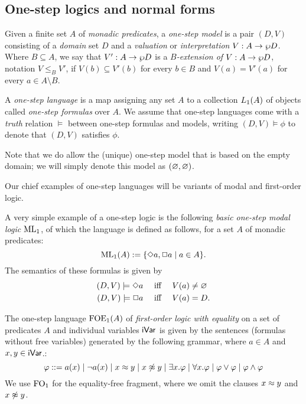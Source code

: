\subsection{One-step logics and normal forms}
\label{sec:onestep-short}
\label{ssec:onestep}

\begin{definition}\label{def:one-step}
Given a finite set $A$ of \emph{monadic predicates}, a \emph{one-step model} is
a pair $(D, V)$ consisting of a \emph{domain} set $D$ and a \emph{valuation}
or \emph{interpretation} $V : A \to \wp D$. 
Where $B \subseteq A$, we say that $V' : A \to \wp D$ is a 
\emph{$B$-extension of} $V : A \to \wp D$, notation $V \leq_{B} V'$,
if $V(b) \subseteq V'(b)$ for every $b \in B$ and $V(a) = V'(a)$ 
for every $a \in A \setminus B$. 

A \emph{one-step language} is a map assigning any set $A$ to a collection
$L_{1}(A)$ of objects called \emph{one-step formulas} over $A$. 
We assume that one-step languages come with a \emph{truth} relation $\models$
between one-step formulas and models, writing $(D, V) \models \phi$ to
denote that $(D,V)$ satisfies $\phi$.
\end{definition}

Note that we do allow the (unique) one-step model that is based on the empty
domain; we will simply denote this model as $(\varnothing,\varnothing)$.

Our chief examples of one-step languages will be variants of modal and 
first-order logic.

\begin{definition}
\label{d:oml}
A very simple example of a one-step logic is the following \emph{basic one-step
modal logic} $\mathrm{ML}_1$, of which the language is defined as follows, for a set 
$A$ of monadic predicates:
\[
\mathrm{ML}_1(A) \mathrel{:=} \{ \Diamond a, \Box a \mid a \in A \}.
\]
The semantics of these formulas is given by
\begin{align*}
   (D, V) \models \Diamond a & \quad\text{ iff }\quad  V(a) \neq \nada
\\ (D, V) \models \Box a     & \quad\text{ iff }\quad  V(a) = D.
\end{align*}
\end{definition}

\begin{definition}
The one-step language $\mathrm{FOE}_1(A)$ of \emph{first-order logic with equality} on 
a set of predicates $A$ and individual variables $\mathsf{iVar}$ is given by the 
sentences (formulas without free variables) generated by the following grammar,
where $a \in A$ and $x,y\in\mathsf{iVar}$.:
\begin{equation}\label{eq:grammarofoe}
\phi \isbnf  a(x) \mid \lnot a(x) \mid x \foeq y \mid x \not\foeq y \mid \exists x.\phi \mid \forall x.\phi \mid \phi \lor \phi \mid \phi \land \phi
\end{equation}
We use $\mathrm{FO}_1$ for the equality-free fragment, where we omit the clauses 
$x \approx y$ and $x \not\approx y$.
\end{definition}

